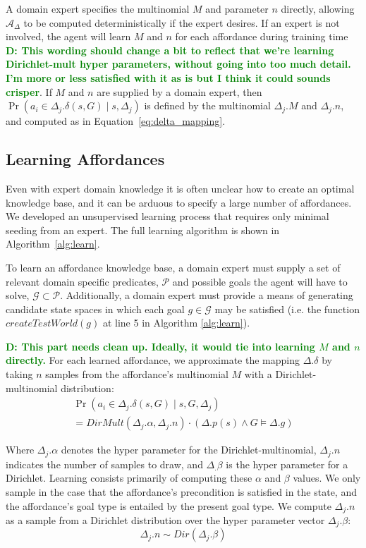 \documentclass[conference]{IEEEtran}
\newcommand{\dnote}[1]{\textcolor{Green}{\textbf{D: #1}}}
\begin{document}
A domain expert specifies the multinomial $M$ and parameter $n$ directly,
allowing $\mathcal{A_\Delta}$ to be computed deterministically if 
the expert desires. If an expert is not involved, the agent will learn $M$ and
$n$ for each affordance during training time \dnote{This wording should change a bit to reflect that we're learning Dirichlet-mult hyper parameters, without going into too much detail. I'm more or less satisfied with it as is but I think it could sounds crisper}. If $M$ and $n$ are supplied
by a domain expert, then $\Pr(a_i \in \Delta_j.\delta(s,G) \mid s, \Delta_j)$ is
defined by the multinomial $\Delta_j.M$ and $\Delta_j.n$, and computed as in Equation~\ref{eq:delta_mapping}.

\subsection{Learning Affordances}

Even with expert domain knowledge it is often unclear how to create
an optimal knowledge base, and it can be arduous to specify a 
large number of affordances. We developed an unsupervised learning
process that requires only minimal seeding from an expert.
The full learning algorithm is shown in Algorithm~\ref{alg:learn}.

To learn an affordance knowledge base, a domain 
expert must supply a set of relevant domain specific predicates,
$\mathcal{P}$ and possible goals the agent will have to solve, $\mathcal{G}
\subset \mathcal{P}$. Additionally, a domain expert must provide a means 
of generating candidate state spaces in which each goal $g \in \mathcal{G}$
 may be satisfied (i.e. the function $createTestWorld(g)$ at line 5 in Algorithm \ref{alg:learn}).

\dnote{This part needs clean up. Ideally, it would tie into learning $M$ and $n$ directly.}
For each learned affordance, we approximate the mapping $\Delta.\delta$ by taking $n$ samples from the affordance's multinomial $M$ with a Dirichlet-multinomial distribution:
\begin{multline}
\Pr(a_i \in \Delta_j.\delta(s,G) \mid s, G, \Delta_j) \\
= DirMult(\Delta_j.\alpha, \Delta_j.n) \cdot \left(\Delta.p(s) \wedge G \models \Delta.g\right)
\end{multline}

\noindent Where $\Delta_j.\alpha$ denotes the hyper parameter
for the Dirichlet-multinomial, $\Delta_j.n$ indicates the number of
samples to draw, and $\Delta_.\beta$ is the hyper parameter for a Dirichlet.
Learning consists primarily of computing these $\alpha$ and $\beta$ values.
We only sample in the case that the affordance's precondition
is satisfied in the state, and the affordance's goal type is entailed by the present goal type.
We compute $\Delta_j.n$ as a sample from a Dirichlet
distribution over the hyper parameter vector $\Delta_j.\beta$:
\begin{equation}
\Delta_j.n \sim Dir(\Delta_j.\beta)
\end{equation}
\end{document}
